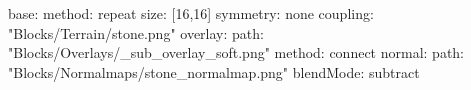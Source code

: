 base:
  method: repeat
  size: [16,16]
  symmetry: none
  coupling: "Blocks/Terrain/stone.png"
overlay:
  path: "Blocks/Overlays/_sub_overlay_soft.png"
  method: connect
normal:
  path: "Blocks/Normalmaps/stone_normalmap.png"
blendMode: subtract
